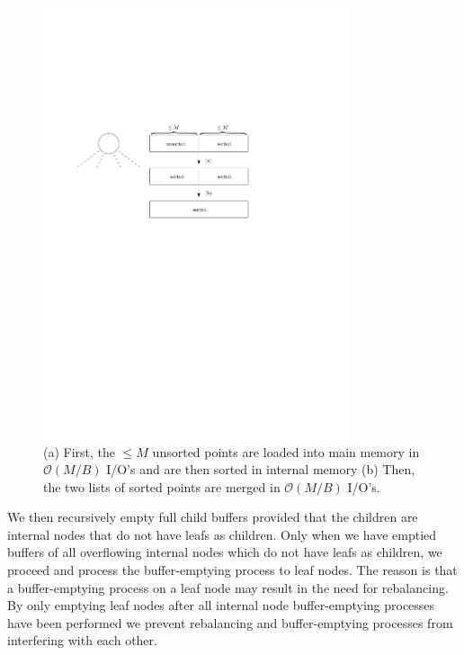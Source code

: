 \documentclass[twoside,11pt,openright]{report}
\begin{document}
\begin{figure}[h]
	\centering
	\includegraphics[width=0.8\textwidth]{../figures/buffer_tree_buffer_sort}
	\caption{(a) First, the $\leq M$ unsorted points are loaded into main memory in $\mathcal{O}(M/B)$ I/O's and are then sorted in internal memory (b) Then, the two lists of sorted points are merged in $\mathcal{O}(M/B)$ I/O's.}
	\label{fig:buffer_tree_buffer_sort}
\end{figure}

We then recursively empty full child buffers provided that the children are internal nodes that do not have leafs as children. Only when we have emptied buffers of all overflowing internal nodes which do not have leafs as children, we proceed and process the buffer-emptying process to leaf nodes. The reason is that a buffer-emptying process on a leaf node may result in the need for rebalancing. By only emptying leaf nodes after all internal node buffer-emptying processes have been performed we prevent rebalancing and buffer-emptying processes from interfering with each other.
\end{document}
